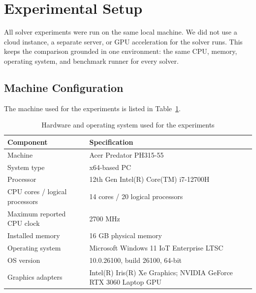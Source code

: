 
\section{Experimental Setup}
\label{sec:experimental_setup}

All solver experiments were run on the same local machine. We did not use a
cloud instance, a separate server, or GPU acceleration for the solver runs. This
keeps the comparison grounded in one environment: the same CPU, memory, operating
system, and benchmark runner for every solver.

\subsection{Machine Configuration}

The machine used for the experiments is listed in
Table~\ref{tab:experimental_machine_setup}.

\begin{table}[htbp]
  \centering
  \caption{Hardware and operating system used for the experiments}
  \label{tab:experimental_machine_setup}
  \begin{tabular}{ll}
    \toprule
    Component & Specification \\
    \midrule
    Machine & Acer Predator PH315-55 \\
    System type & x64-based PC \\
    Processor & 12th Gen Intel(R) Core(TM) i7-12700H \\
    CPU cores / logical processors & 14 cores / 20 logical processors \\
    Maximum reported CPU clock & 2700 MHz \\
    Installed memory & 16 GB physical memory \\
    Operating system & Microsoft Windows 11 IoT Enterprise LTSC \\
    OS version & 10.0.26100, build 26100, 64-bit \\
    Graphics adapters & Intel(R) Iris(R) Xe Graphics; NVIDIA GeForce RTX 3060 Laptop GPU \\
    \bottomrule
  \end{tabular}
\end{table}

